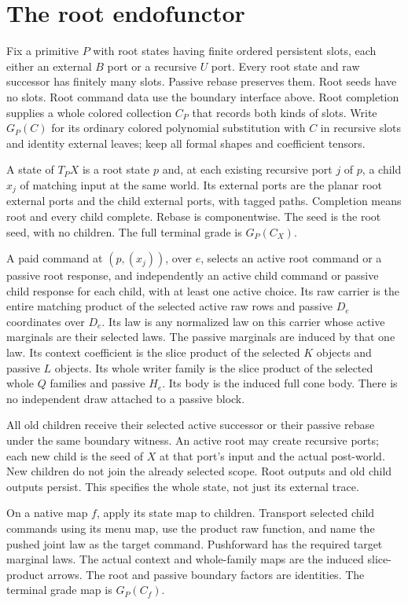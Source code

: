 \documentclass[11pt]{article}
\begin{document}
\section{The root endofunctor}
Fix a primitive $P$ with root states having finite ordered persistent slots, each either an external $B$ port or a recursive $U$ port. Every root state and raw successor has finitely many slots. Passive rebase preserves them. Root seeds have no slots. Root command data use the boundary interface above. Root completion supplies a whole colored collection $C_P$ that records both kinds of slots. Write $G_P(C)$ for its ordinary colored polynomial substitution with $C$ in recursive slots and identity external leaves; keep all formal shapes and coefficient tensors.

A state of $T_PX$ is a root state $p$ and, at each existing recursive port $j$ of $p$, a child $x_j$ of matching input at the same world. Its external ports are the planar root external ports and the child external ports, with tagged paths. Completion means root and every child complete. Rebase is componentwise. The seed is the root seed, with no children. The full terminal grade is $G_P(C_X)$.

A paid command at $(p,(x_j))$, over $e$, selects an active root command or a passive root response, and independently an active child command or passive child response for each child, with at least one active choice. Its raw carrier is the entire matching product of the selected active raw rows and passive $D_e$ coordinates over $D_e$. Its law is any normalized law on this carrier whose active marginals are their selected laws. The passive marginals are induced by that one law. Its context coefficient is the slice product of the selected $K$ objects and passive $L$ objects. Its whole writer family is the slice product of the selected whole $Q$ families and passive $H_e$. Its body is the induced full cone body. There is no independent draw attached to a passive block.

All old children receive their selected active successor or their passive rebase under the same boundary witness. An active root may create recursive ports; each new child is the seed of $X$ at that port's input and the actual post-world. New children do not join the already selected scope. Root outputs and old child outputs persist. This specifies the whole state, not just its external trace.

On a native map $f$, apply its state map to children. Transport selected child commands using its menu map, use the product raw function, and name the pushed joint law as the target command. Pushforward has the required target marginal laws. The actual context and whole-family maps are the induced slice-product arrows. The root and passive boundary factors are identities. The terminal grade map is $G_P(C_f)$.
\end{document}
